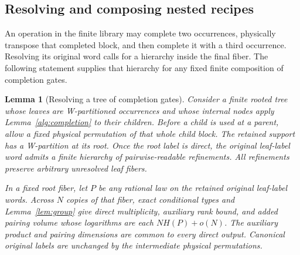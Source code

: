 \documentclass[11pt]{article}
\numberwithin{equation}{section}
\newtheorem{lemma}[theorem]{Lemma}
\theoremstyle{definition}
\theoremstyle{remark}
\begin{document}
\subsection{Resolving and composing nested recipes}

An operation in the finite library may complete two occurrences, physically
transpose that completed block, and then complete it with a third
occurrence.  Resolving its original word calls for a hierarchy inside the
final fiber.  The following statement supplies that hierarchy for any
fixed finite composition of completion gates.

\begin{lemma}[Resolving a tree of completion gates]
\label{alg:completion-hierarchy}
Consider a finite rooted tree whose leaves are W-partitioned occurrences
and whose internal nodes apply Lemma~\ref{alg:completion} to their children.
Before a child is used at a parent, allow a fixed physical permutation of
that whole child block.  The retained support has a W-partition at its
root.  Once the root label is direct, the original leaf-label word admits
a finite hierarchy of pairwise-readable refinements.  All refinements
preserve arbitrary unresolved leaf fibers.

In a fixed root fiber, let \(P\) be any rational law on the retained
original leaf-label words.  Across \(N\) copies of that fiber, exact
conditional types and Lemma~\ref{lem:group} give direct multiplicity,
auxiliary rank bound, and added pairing volume whose logarithms are each
\(NH(P)+o(N)\).  The auxiliary product and pairing dimensions are common
to every direct output.  Canonical original labels are unchanged by the
intermediate physical permutations.
\end{lemma}
\end{document}
